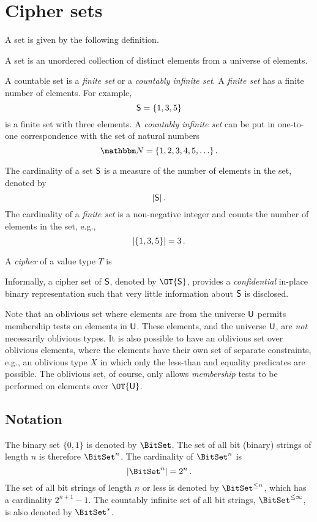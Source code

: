 \documentclass[ ../main.tex]{subfiles}
\begin{document}
\section{Cipher sets}
\label{sec:ob_set_def}
A set is given by the following definition.
\begin{definition}
A set is an unordered collection of distinct elements from a universe of elements.
\end{definition}

A countable set is a \emph{finite set} or a \emph{countably infinite set}. A \emph{finite set} has a finite number of elements. For example,
\[
    \Set{S} = \{ 1, 3, 5 \}
\]
is a finite set with three elements. A \emph{countably infinite set} can be put in one-to-one correspondence with the set of natural numbers
\begin{equation}
    \NatSet = \{1,2,3,4,5,\ldots\}\,.
\end{equation}

The cardinality of a set $\Set{S}$ is a measure of the number of elements in the set, denoted by
\begin{equation}
    \Card{\Set{S}}\,.
\end{equation}
The cardinality of a \emph{finite set} is a non-negative integer and counts the number of elements in the set, e.g.,
\[
    \lvert\left\{ 1, 3, 5\right\}\rvert = 3\,.
\]


A \emph{cipher} of a value type $T$ is 

Informally, a cipher set of $\Set{S}$, denoted by $\OT{\Set{S}}$, provides a \emph{confidential} in-place binary representation such that very little information about $\Set{S}$ is disclosed.

Note that an oblivious set where elements are from the universe $\Set{U}$ permits membership tests on elements in $\Set{U}$.
These elements, and the universe $\Set{U}$, are \emph{not} necessarily oblivious types.
It is also possible to have an oblivious set over oblivious elements, where the elements have their own set of separate constraints, e.g., an oblivious type $X$ in which only the less-than and equality predicates are possible.
The oblivious set, of course, only allows \emph{membership} tests to be performed on elements over $\OT{\Set{U}}$.

\subsection{Notation}
The binary set $\{0,1\}$ is denoted by $\BitSet$. The set of all bit (binary) strings of length $n$ is therefore $\BitSet^n$. The cardinality of $\BitSet^n$ is
\begin{equation}
\Card{\BitSet^n} = 2^n\,.
\end{equation}
The set of all bit strings of length $n$ or less is denoted by $\BitSet^{\leq n}$, which has a cardinality $2^{n+1}-1$. The countably infinite set of all bit strings, $\BitSet^{\leq \infty}$, is also denoted by $\BitSet^{*}$.
\end{document}
